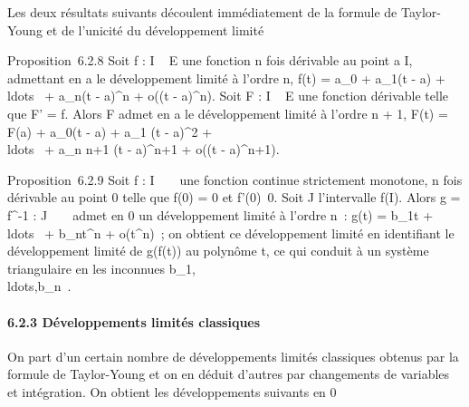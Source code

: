 \documentclass[]{article}
\begin{document}
Les deux résultats suivants découlent immédiatement de la formule de
Taylor-Young et de l'unicité du développement limité

Proposition~6.2.8 Soit f : I \rightarrow~ E une fonction n fois dérivable au point
a \in I, admettant en a le développement limité à l'ordre n, f(t) =
a_0 + a_1(t - a) +
\\ldots~ +
a_n(t - a)^n + o((t - a)^n). Soit F : I \rightarrow~
E une fonction dérivable telle que F' = f. Alors F admet en a le
développement limité à l'ordre n + 1, F(t) = F(a) + a_0(t - a)
+ a_1  (t - a)^2 +
\\ldots~ +
a_n \over n+1 (t - a)^n+1 + o((t
- a)^n+1).

Proposition~6.2.9 Soit f : I \rightarrow~ ~ une fonction continue strictement
monotone, n fois dérivable au point 0 telle que f(0) = 0 et
f'(0)\neq~0. Soit J l'intervalle f(I). Alors g =
f^-1 : J \rightarrow~ ~ admet en 0 un développement limité à l'ordre n~:
g(t) = b_1t +
\\ldots~ +
b_nt^n + o(t^n)~; on obtient ce
développement limité en identifiant le développement limité de g(f(t))
au polynôme t, ce qui conduit à un système triangulaire en les inconnues
b_1,\\ldots,b_n~.

\paragraph{6.2.3 Développements limités classiques}

On part d'un certain nombre de développements limités classiques obtenus
par la formule de Taylor-Young et on en déduit d'autres par changements
de variables et intégration. On obtient les développements suivants en 0
\end{document}
